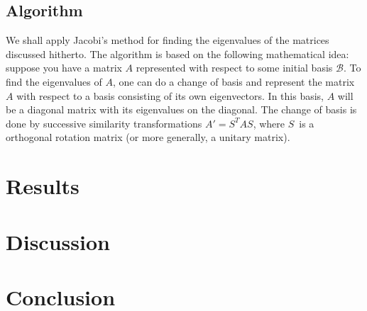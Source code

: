 \documentclass[english,notitlepage,reprint]{revtex4-1}  %
\begin{document}
\subsection*{Algorithm}
We shall apply Jacobi's method for finding the eigenvalues of the matrices discussed hitherto. The algorithm is based on the following mathematical idea: suppose you have a matrix $A$ represented with respect to some initial basis $\mathcal{B}$. To find the eigenvalues of $A$, one can do a change of basis and represent the matrix $A$ with respect to a basis consisting of its own eigenvectors. In this basis, $A$ will be a diagonal matrix with its eigenvalues on the diagonal. The change of basis is done by successive similarity transformations $A' = S^TA S$, where $S$ is a orthogonal rotation matrix (or more generally, a unitary matrix).
\section{Results}
\section{Discussion}
\section{Conclusion}
\end{document}
